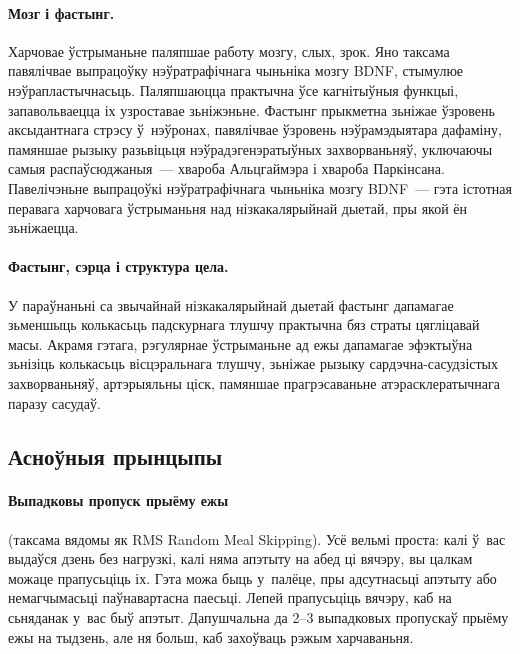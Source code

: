 \paragraph{Мозг і фастынг.}
Харчовае ўстрыманьне паляпшае работу мозгу, слых, зрок. Яно таксама павялічвае выпрацоўку нэўратрафічнага чыньніка мозгу BDNF, стымулюе нэўрапластычнасьць. Паляпшаюцца практычна ўсе кагнітыўныя функцыі, запавольваецца іх узроставае зьніжэньне. Фастынг прыкметна зьніжае ўзровень аксыдантнага стрэсу ў~нэўронах, павялічвае ўзровень нэўрамэдыятара дафаміну, памяншае рызыку разьвіцьця нэўрадэгенэратыўных захворваньняў, уключаючы самыя распаўсюджаныя~--- хвароба Альцгаймэра і хвароба Паркінсана. Павелічэньне выпрацоўкі нэўратрафічнага чыньніка мозгу BDNF~--- гэта істотная перавага харчовага ўстрыманьня над нізкакалярыйнай дыетай, пры якой ён зьніжаецца.


\paragraph{Фастынг, сэрца і структура цела.}
У параўнаньні са звычайнай нізкакалярыйнай дыетай фастынг дапамагае зьменшыць колькасьць падскурнага тлушчу практычна бяз страты цягліцавай масы. Акрамя гэтага, рэгулярнае ўстрыманьне ад ежы дапамагае эфэктыўна зьнізіць колькасьць вісцэральнага тлушчу, зьніжае рызыку сардэчна-сасудзістых захворваньняў, артэрыяльны ціск, памяншае прагрэсаваньне атэрасклератычнага паразу сасудаў.

\subsection{Асноўныя прынцыпы}

\paragraph{Выпадковы пропуск прыёму ежы} (таксама вядомы як RMS Random Meal Skipping).
Усё вельмі проста: калі ў~вас выдаўся дзень без нагрузкі, калі няма апэтыту на абед ці вячэру, вы цалкам можаце прапусьціць іх. Гэта можа быць у~палёце, пры адсутнасьці апэтыту або немагчымасьці паўнавартасна паесьці. Лепей прапусьціць вячэру, каб на сьняданак у~вас быў апэтыт. Дапушчальна да 2--3 выпадковых пропускаў прыёму ежы на тыдзень, але ня больш, каб захоўваць рэжым харчаваньня.

